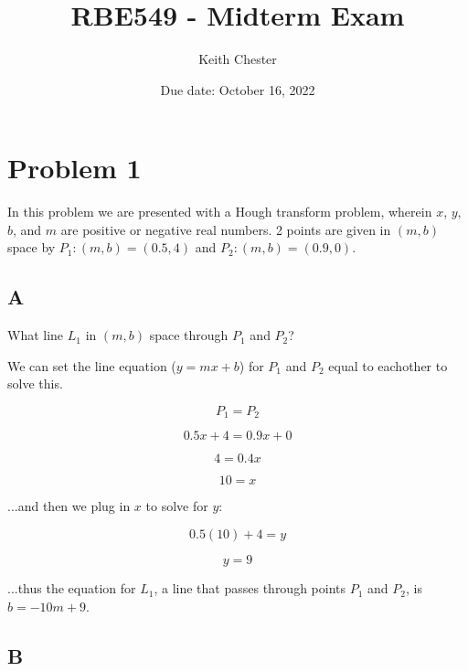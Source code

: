 \documentclass{article}
\title{RBE549 - Midterm Exam}
\author{Keith Chester}
\date{Due date: October 16, 2022}
\begin{document}
\maketitle

\section*{Problem 1}

In this problem we are presented with a Hough transform problem, wherein $x$, $y$, $b$, and $m$ are positive or negative real numbers. 2 points are given in $(m,b)$ space by $P_1: (m,b)=(0.5,4)$ and $P_2: (m,b)=(0.9,0)$.

\subsection*{A}

What line $L_1$ in $(m,b)$ space through $P_1$ and $P_2$?

We can set the line equation ($y=mx+b$) for $P_1$ and $P_2$ equal to eachother to solve this.

\begin{equation}
    P_1 = P_2
\end{equation}

\begin{equation}
    0.5x+4 = 0.9x + 0
\end{equation}

\begin{equation}
    4 = 0.4x
\end{equation}

\begin{equation}
    10 = x
\end{equation}

\noindent ...and then we plug in $x$ to solve for $y$:

\begin{equation}
    0.5(10)+4 = y
\end{equation}

\begin{equation}
    y = 9
\end{equation}

\noindent ...thus the equation for $L_1$, a line that passes through points $P_1$ and $P_2$, is $b = -10m + 9$.

\subsection*{B}
\end{document}
